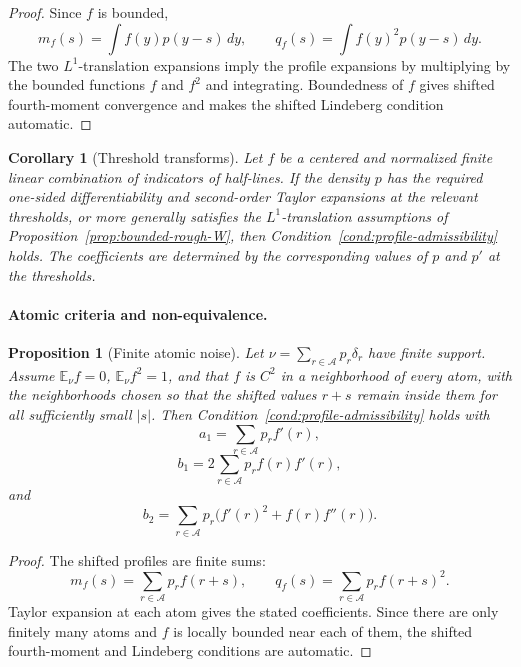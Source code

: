 \documentclass[11pt]{article}
\newtheorem{proposition}[theorem]{Proposition}
\newtheorem{corollary}[theorem]{Corollary}
\theoremstyle{definition}
\theoremstyle{remark}
\newcommand{\E}{\mathbb E}
\begin{document}
\begin{proof}
Since \(f\) is bounded,
\[
        m_f(s)=\int f(y)p(y-s)\,dy,
        \qquad
        q_f(s)=\int f(y)^2p(y-s)\,dy.
\]
The two \(L^1\)-translation expansions imply the profile expansions by multiplying by the bounded functions \(f\) and \(f^2\) and integrating.  Boundedness of \(f\) gives shifted fourth-moment convergence and makes the shifted Lindeberg condition automatic.
\end{proof}

\begin{corollary}[Threshold transforms]
\label{cor:threshold-W}
Let \(f\) be a centered and normalized finite linear combination of indicators of half-lines.  If the density \(p\) has the required one-sided differentiability and second-order Taylor expansions at the relevant thresholds, or more generally satisfies the \(L^1\)-translation assumptions of Proposition~\ref{prop:bounded-rough-W}, then Condition~\ref{cond:profile-admissibility} holds.  The coefficients are determined by the corresponding values of \(p\) and \(p'\) at the thresholds.
\end{corollary}

\paragraph{Atomic criteria and non-equivalence.}

\begin{proposition}[Finite atomic noise]
\label{prop:atomic-W}
Let \(\nu=\sum_{r\in\mathcal A}p_r\delta_r\) have finite support.  Assume
\(\E_\nu f=0\), \(\E_\nu f^2=1\), and that \(f\) is \(C^2\) in a
neighborhood of every atom, with the neighborhoods chosen so that the shifted
values \(r+s\) remain inside them for all sufficiently small \(|s|\).  Then
Condition~\ref{cond:profile-admissibility} holds with
\[
        a_1=\sum_{r\in\mathcal A}p_rf'(r),
\]
\[
        b_1=2\sum_{r\in\mathcal A}p_rf(r)f'(r),
\]
and
\[
        b_2=\sum_{r\in\mathcal A}p_r\bigl(f'(r)^2+f(r)f''(r)\bigr).
\]
\end{proposition}

\begin{proof}
The shifted profiles are finite sums:
\[
        m_f(s)=\sum_{r\in\mathcal A}p_rf(r+s),
        \qquad
        q_f(s)=\sum_{r\in\mathcal A}p_rf(r+s)^2.
\]
Taylor expansion at each atom gives the stated coefficients.  Since there are only finitely many atoms and \(f\) is locally bounded near each of them, the shifted fourth-moment and Lindeberg conditions are automatic.
\end{proof}
\end{document}
